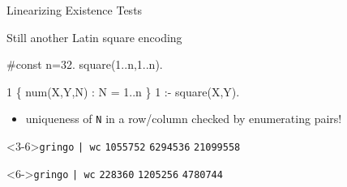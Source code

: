 \begin{frame}[fragile]{Linearizing Existence Tests}
\begin{block}{Still another Latin square encoding}
\vspace*{-4mm}\footnotesize
\begin{semiverbatim}
#const n=32. square(1..n,1..n).

1 \{ num(X,Y,N) : N = 1..n \} 1 :- square(X,Y).

\end{semiverbatim}
\vspace*{-2mm}
\end{block}
\begin{itemize}
\item<2-3> \alert<2>{uniqueness of \lstinline{N} in a row/column checked by enumerating pairs!}
\end{itemize}
\vspace*{-4mm}
\begin{minipage}[t]{0.47\linewidth}%
\begin{block}<3-6>{\lstinline{gringo}  \lstinline{| wc}}
\lstinline{1055752} \alert<6>{\lstinline{6294536}} \lstinline{21099558}
\end{block}
\end{minipage}\hfill
\begin{minipage}[t]{0.47\linewidth}%
\begin{block}<6->{\lstinline{gringo}  \lstinline{| wc}}
\lstinline{228360} \alert<6>{\lstinline{1205256}} \lstinline{4780744}
\end{block}
\end{minipage}
\end{frame}
